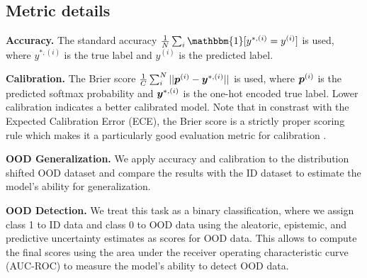 \subsection{Metric details}
\label{sec:metric_details}


\textbf{Accuracy.} The standard accuracy $\frac{1}{N}\sum_i \mathbbm{1}[y^{*,(i)} = y^{(i)}]$ is used, where $y^{*,(i)}$ is the true label and $y^{(i)}$ is the predicted label. 

\textbf{Calibration.} The Brier score $\frac{1}{C}\sum_i^N||\bm{p}^{(i)} - \bm{y}^{*, (i)}||$ is used, where $\bm{p}^{(i)}$ is the predicted softmax probability and $\bm{y}^{*, (i)}$ is the one-hot encoded true label. Lower calibration indicates a better calibrated model. Note that in constrast with the Expected Calibration Error (ECE), the Brier score is a strictly proper scoring rule which makes it a particularly good evaluation metric for calibration \cite{scoring-rules}.

\textbf{OOD Generalization.} We apply accuracy and calibration to the distribution shifted OOD dataset and compare the results with the ID dataset to estimate the model's ability for generalization.

\textbf{OOD Detection.} We treat this task as a binary classification, where we assign class 1 to ID data and class 0 to OOD data using the aleatoric, epistemic, and predictive uncertainty estimates as scores for OOD data. This allows to compute the final scores using the area under the receiver operating characteristic curve (AUC-ROC) to measure the model's ability to detect OOD data. 
